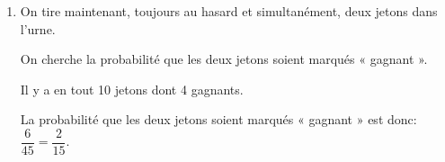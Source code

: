 \begin{enumerate}
\item On tire maintenant, toujours au hasard et simultanément, deux jetons dans l'urne.

On cherche la probabilité que les deux jetons soient marqués « gagnant ». 


Il y a en tout 10 jetons dont 4 gagnants.


La probabilité que les deux jetons soient marqués « gagnant » est donc: $\dfrac{6}{45} = \dfrac{2}{15}$. 

\end{enumerate}


